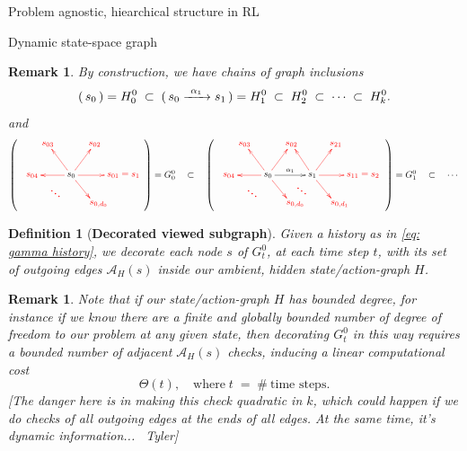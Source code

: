 \documentclass[11pt]{article}
\newtheorem{definition}[subsubsection]{Definition}
\newtheorem{remark}[subsubsection]{Remark}
\begin{document}
\begin{section}{Problem agnostic, hiearchical structure in RL}
\begin{subsection}{Dynamic state-space graph}
\begin{remark}
\normalfont
By construction, we have chains of graph inclusions
$$
(\ \!{\color{black} s_0}\ \!)=H^{0}_{0}\;\subset\;(\ \!{\color{black} s_0\xrightarrow{\ \alpha_{1}\ }s_1}\ \!)=H^{0}_{1}
\;\subset\; H^{0}_{2}
\;\subset\; \cdots
\;\subset\; H^{0}_{k}.
$$
and
$$
\scalebox{.9}{$
\left(\ \ 
{\color{red}
\begin{xy}
(0,0)*+{{\color{black} s_0 }}="s0";
(15,0)*+{ s_{01}=s_{1}\!\!\!\!\!\!\!\!\!\!\!\!\!\!\!\!\!}="s1";
(9,12)*+{s_{02}}="s02";
(-9,12)*+{s_{03}}="s03";
(-15,0)*+{s_{04}}="s04";
(-6,-6)*+{\pmb{\ddots}}="sd1";
(9,-11)*+{s_{0,d_{0}}\!\!\!\!\!}="sd";
{\ar@{->} "s0"; "s1"};
{\ar@{->} "s0"; "s02"};
{\ar@{->} "s0"; "s03"};
{\ar@{->} "s0"; "s04"};
{\ar@{->} "s0"; "sd"};
\end{xy}
}
\ \ \ \ \ \ \ \ \ 
\right)
=G^{0}_{0}
\quad\subset\quad
\left(\ \ 
{\color{red}
\begin{xy}
(0,0)*+{{\color{black} s_0 }}="s0";
(17,0)*+{{\color{black} s_1 }}="s1";
(9,12)*+{s_{02}}="s02";
(-9,12)*+{s_{03}}="s03";
(-15,0)*+{s_{04}}="s04";
(-6,-6)*+{\pmb{\ddots}}="sd1";
(9,-11)*+{s_{0,d_{0}}\!\!\!\!\!}="sd";
{\ar@[black]^{{\color{black} \alpha_{1}}} "s0"; "s1"};
{\ar@{->} "s0"; "s02"};
{\ar@{->} "s0"; "s03"};
{\ar@{->} "s0"; "s04"};
{\ar@{->} "s0"; "sd"};
(30,0)*+{s_{11}=s_{2}\!\!\!\!\!\!\!\!\!\!\!\!\!\!\!\!\!\!\!\!\!\!}="s2";
(26,12)*+{s_{21}}="s12";
(26,-11)*+{s_{0,d_{1}}\!\!\!\!\!}="s1d";
{\ar@{->} "s1"; "s12"};
{\ar@{->} "s1"; "s02"};
{\ar@{->} "s1"; "s2"};
{\ar@{->} "s1"; "s1d"};
(13,-5)*+{\pmb{\ddots}};
\end{xy}
}
\ \ \ \ \ \ \ \ \ \ \ \ 
\right)
=G^{0}_{1}
\quad\subset\quad\cdots$}
$$
\end{remark}

\begin{definition}[{\bf Decorated viewed subgraph}]
\normalfont
Given a history as in \eqref{eq: gamma history}, we decorate each node $s$ of $G^{0}_{t}$, at each time step $t$, with its set of outgoing edges $\mathcal{A}_{H}(s)$ {\em inside} our ambient, hidden state/action-graph $H$.
\end{definition}

\begin{remark}
\normalfont
Note that if our state/action-graph $H$ has bounded degree, for instance if we know there are a finite and globally bounded number of degree of freedom to our problem at any given state, then decorating $G^{0}_{t}$ in this way requires a bounded number of adjacent $\mathcal{A}_{H}(s)$ checks, inducing a linear computational cost
$$
\Theta(t),\quad\text{where}\;t\;=\;\#\ \text{time steps}.
$$
{\color{blue} [The danger here is in making this check quadratic in $k$, which could happen if we do checks of all outgoing edges at the ends of all edges. At the same time, it's dynamic information... \textemdash\ Tyler]} 


\end{remark}
\end{subsection}
\end{section}
\end{document}
